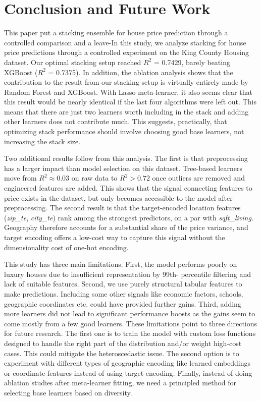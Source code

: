 \documentclass[conference]{IEEEtran}
\begin{document}
\section{Conclusion and Future Work}
This paper put a stacking ensemble for house price prediction through a controlled comparison and a leave-In this study, we analyze stacking for house price predictions through a controlled experiment on the King County Housing dataset. Our optimal stacking setup reached $R^{2}$ = 0.7429, barely beating XGBoost ($R^{2}$ = 0.7375). In addition, the ablation analysis shows that the contribution to the result from our stacking setup is virtually entirely made by Random Forest and XGBoost. With Lasso meta-learner, it also seems clear that this result would be nearly identical if the last four algorithms were left out. This means that there are just two learners worth including in the stack and adding other learners does not contribute much. This suggests, practically, that optimizing stack performance should involve choosing good base learners, not increasing the stack size.

Two additional results follow from this analysis. The first is that preprocessing has a larger impact than model selection on this dataset. Tree-based learners move from $R^{2}\approx 0.03$ on raw data to $R^{2}>0.72$ once outliers are removed and engineered features are added. This shows that the signal connecting features to price exists in the dataset, but only becomes accessible to the model after preprocessing. The second result is that the target-encoded location features (\textit{zip\_te}, \textit{city\_te}) rank among the strongest predictors, on a par with \textit{sqft\_living}. Geography therefore accounts for a substantial share of the price variance, and target encoding offers a low-cost way to capture this signal without the dimensionality cost of one-hot encoding.

This study has three main limitations. First, the model performs poorly on luxury houses due to insufficient representation by 99th- percentile filtering and lack of suitable features. Second, we use purely structural tabular features to make predictions. Including some other signals like economic factors, schools, geographic coordinates etc. could have provided further gains. Third, adding more learners did not lead to significant performance boosts as the gains seem to come mostly from a few good learners. These limitations point to three directions for future research. The first one is to train the model with custom loss functions designed to handle the right part of the distribution and/or weight high-cost cases. This could mitigate the heteroscedastic issue\cite{hjort2022house}. The second option is to experiment with different types of geographic encoding like learned embeddings or coordinate features instead of using target-encoding. Finally, instead of doing ablation studies after meta-learner fitting, we need a principled method for selecting base learners based on diversity.



\vspace{12pt}
\end{document}
